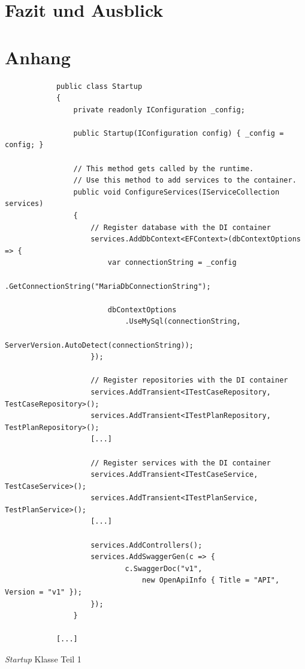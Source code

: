 \documentclass[a4paper, fontsize=11pt, parskip=half, twoside]{scrreprt}
\begin{document}
	
	
	\chapter{Fazit und Ausblick}
	
	
	\clearpage
	\printbibliography
	
	\chapter*{Anhang}
	\begin{listing}[ht]
		\begin{verbatim}
			public class Startup
			{
				private readonly IConfiguration _config;		
				
				public Startup(IConfiguration config) { _config = config; }
				
				// This method gets called by the runtime. 
				// Use this method to add services to the container.
				public void ConfigureServices(IServiceCollection services)
				{
					// Register database with the DI container
					services.AddDbContext<EFContext>(dbContextOptions => {
						var connectionString = _config
							.GetConnectionString("MariaDbConnectionString");	
									
						dbContextOptions
							.UseMySql(connectionString,
								ServerVersion.AutoDetect(connectionString));
					});
					
					// Register repositories with the DI container
					services.AddTransient<ITestCaseRepository, TestCaseRepository>();
					services.AddTransient<ITestPlanRepository, TestPlanRepository>();
					[...]
					
					// Register services with the DI container
					services.AddTransient<ITestCaseService, TestCaseService>();
					services.AddTransient<ITestPlanService, TestPlanService>();
					[...]
					
					services.AddControllers();
					services.AddSwaggerGen(c => { 
							c.SwaggerDoc("v1", 
								new OpenApiInfo { Title = "API", Version = "v1" }); 
					});
				}
				
			[...]
		\end{verbatim}
		\caption{\emph{Startup} Klasse Teil 1}
		\label{lst:startupClassPart1}
	\end{listing}
\end{document}
